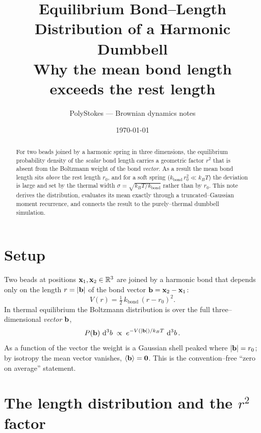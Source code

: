 \documentclass[11pt]{article}
\title{Equilibrium Bond--Length Distribution of a Harmonic Dumbbell\\
\large Why the mean bond length exceeds the rest length}
\author{PolyStokes --- Brownian dynamics notes}
\date{\today}
\newcommand{\kT}{k_{B}T}
\newcommand{\kbond}{k_{\mathrm{bond}}}
\newcommand{\rzero}{r_{0}}
\newcommand{\avg}[1]{\left\langle #1 \right\rangle}
\begin{document}
\maketitle

\begin{abstract}
For two beads joined by a harmonic spring in three dimensions, the equilibrium
probability density of the \emph{scalar} bond length carries a geometric factor
$r^{2}$ that is absent from the Boltzmann weight of the bond \emph{vector}. As a
result the mean bond length sits \emph{above} the rest length $\rzero$, and for a
soft spring ($\kbond\,\rzero^{2}\ll \kT$) the deviation is large and set by the
thermal width $\sigma=\sqrt{\kT/\kbond}$ rather than by $\rzero$. This note derives
the distribution, evaluates its mean exactly through a truncated--Gaussian moment
recurrence, and connects the result to the purely--thermal dumbbell simulation.
\end{abstract}

\section{Setup}

Two beads at positions $\vb{x}_{1},\vb{x}_{2}\in\mathbb{R}^{3}$ are joined by a
harmonic bond that depends only on the length $r=\abs{\vb{b}}$ of the bond vector
$\vb{b}=\vb{x}_{2}-\vb{x}_{1}$:
\begin{equation}
  V(r)=\tfrac{1}{2}\,\kbond\,(r-\rzero)^{2}.
\end{equation}
In thermal equilibrium the Boltzmann distribution is over the full three--dimensional
\emph{vector} $\vb{b}$,
\begin{equation}
  P(\vb{b})\,\dd[3]{b}\;\propto\; e^{-V(\abs{\vb{b}})/\kT}\,\dd[3]{b}.
  \label{eq:vecdist}
\end{equation}
As a function of the vector the weight is a Gaussian shell peaked where
$\abs{\vb{b}}=\rzero$; by isotropy the mean vector vanishes, $\avg{\vb{b}}=\vb0$.
This is the convention--free ``zero on average'' statement.

\section{The length distribution and the \texorpdfstring{$r^{2}$}{r\^{}2} factor}
\end{document}
